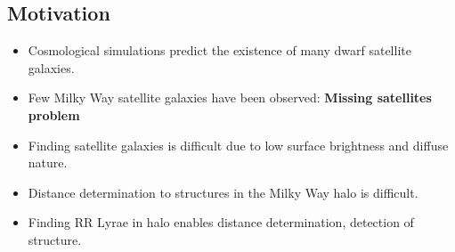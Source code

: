 \documentclass[a0,portrait]{a0poster}
\begin{document}
\begin{multicols}{2} %







\section*{Motivation}

\begin{itemize}
\item Cosmological simulations predict the existence of many dwarf satellite galaxies.
\item Few Milky Way satellite galaxies have been observed: \textbf{Missing satellites problem} \cite{kauffmann1993formation,klypin1999missing,moore1999dark}
\item Finding satellite galaxies is difficult due to low surface brightness and diffuse nature.
\item Distance determination to structures in the Milky Way halo is difficult.
\item Finding RR Lyrae in halo enables distance determination, detection of structure. \cite{baker2015charting}
\end{itemize}




\end{multicols}
\end{document}
